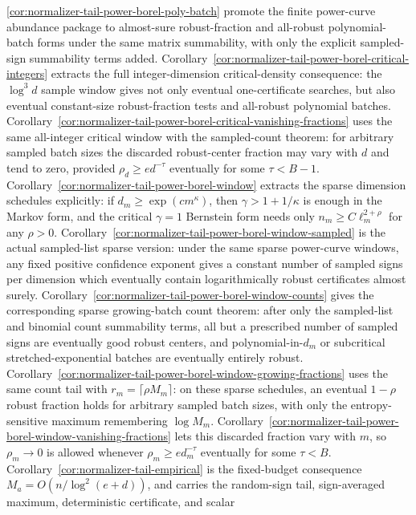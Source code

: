\documentclass[11pt]{amsart}
\numberwithin{equation}{section}
\theoremstyle{definition}
\theoremstyle{remark}
\begin{document}
\ref{cor:normalizer-tail-power-borel-poly-batch} promote the finite power-curve
abundance package to almost-sure robust-fraction and all-robust polynomial-batch
forms under the same matrix summability, with only the explicit sampled-sign
summability terms added.
Corollary~\ref{cor:normalizer-tail-power-borel-critical-integers} extracts the
full integer-dimension critical-density consequence: the \(\log^3 d\) sample
window gives not only eventual one-certificate searches, but also eventual
constant-size robust-fraction tests and all-robust polynomial batches.
Corollary~\ref{cor:normalizer-tail-power-borel-critical-vanishing-fractions}
uses the same all-integer critical window with the sampled-count theorem: for
arbitrary sampled batch sizes the discarded robust-center fraction may vary
with \(d\) and tend to zero, provided \(\rho_d\ge e d^{-\tau}\) eventually for
some \(\tau<B-1\).
Corollary~\ref{cor:normalizer-tail-power-borel-window} extracts the sparse
dimension schedules explicitly: if \(d_m\ge\exp(c m^\kappa)\), then
\(\gamma>1+1/\kappa\) is enough in the Markov form, and the critical
\(\gamma=1\) Bernstein form needs only \(n_m\ge C\ell_m^{2+\rho}\) for any
\(\rho>0\).
Corollary~\ref{cor:normalizer-tail-power-borel-window-sampled} is the actual
sampled-list sparse version: under the same sparse power-curve windows, any
fixed positive confidence exponent gives a constant number of sampled signs per
dimension which eventually contain logarithmically robust certificates almost
surely.
Corollary~\ref{cor:normalizer-tail-power-borel-window-counts} gives the
corresponding sparse growing-batch count theorem: after only the sampled-list
and binomial count summability terms, all but a prescribed number of sampled
signs are eventually good robust centers, and polynomial-in-\(d_m\) or
subcritical stretched-exponential batches are eventually entirely robust.
Corollary~\ref{cor:normalizer-tail-power-borel-window-growing-fractions} uses
the same count tail with \(r_m=\lceil\rho M_m\rceil\): on these sparse schedules,
an eventual \(1-\rho\) robust fraction holds for arbitrary sampled batch sizes,
with only the entropy-sensitive maximum remembering \(\log M_m\).
Corollary~\ref{cor:normalizer-tail-power-borel-window-vanishing-fractions}
lets this discarded fraction vary with \(m\), so \(\rho_m\to0\) is allowed
whenever \(\rho_m\ge e d_m^{-\tau}\) eventually for some \(\tau<B\).
Corollary~\ref{cor:normalizer-tail-empirical}
is the fixed-budget consequence \(M_a=O(n/\log^2(e+d))\), and carries the
random-sign tail, sign-averaged maximum, deterministic certificate, and scalar
\end{document}
